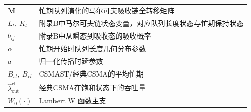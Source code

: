\begin{longtable}{p{4.0cm}p{11.0cm}}
        $\mathbf{M}$ &忙期队列演化的马尔可夫吸收链全转移矩阵\\
        $L_t,\ K_t$ &附录B中马尔可夫链状态变量，对应队列长度状态与忙期保持状态\\
        $b_{ij}$ &附录B中从瞬态到吸收态的吸收概率\\

        $\alpha$ &忙期开始时队列长度几何分布参数\\

        $a$ &归一化传播时延参数\\
        $\overline{B}_{st},\ \overline{B}_{cl}$ &CSMAST/经典CSMA的平均忙期\\
        $\hat{\lambda}_{\text{out}}^{\text{cl}}$ &经典CSMA在饱和状态下的吞吐量\\
        $W_0(\cdot)$ &Lambert W 函数主支\\

\end{longtable}

